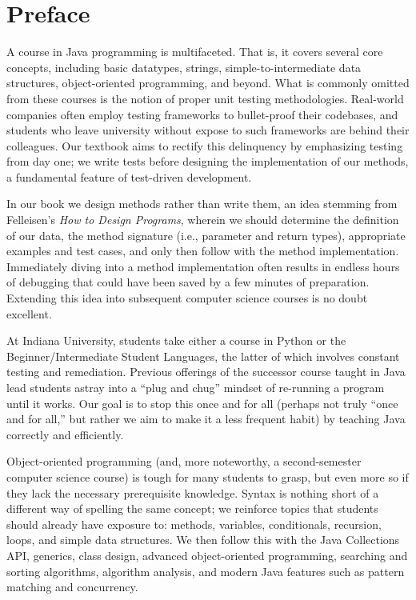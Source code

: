 \chapter*{Preface}

A course in Java programming is multifaceted. That is, it covers several core concepts, including basic datatypes, strings, simple-to-intermediate data structures, object-oriented programming, and beyond. What is commonly omitted from these courses is the notion of proper unit testing methodologies. Real-world companies often employ testing frameworks to bullet-proof their codebases, and students who leave university without expose to such frameworks are behind their colleagues. Our textbook aims to rectify this delinquency by emphasizing testing from day one; we write tests before designing the implementation of our methods, a fundamental feature of test-driven development.

In our book we design methods rather than write them, an idea stemming from Felleisen's \textit{How to Design Programs}, wherein we should determine the definition of our data, the method signature (i.e., parameter and return types), appropriate examples and test cases, and only then follow with the method implementation. Immediately diving into a method implementation often results in endless hours of debugging that could have been saved by a few minutes of preparation. Extending this idea into subsequent computer science courses is no doubt excellent.

At Indiana University, students take either a course in Python or the Beginner/Intermediate Student Languages, the latter of which involves constant testing and remediation. Previous offerings of the successor course taught in Java lead students astray into a ``plug and chug'' mindset of re-running a program until it works. Our goal is to stop this once and for all (perhaps not truly ``once and for all,'' but rather we aim to make it a less frequent habit) by teaching Java correctly and efficiently. 

Object-oriented programming (and, more noteworthy, a second-semester computer science course) is tough for many students to grasp, but even more so if they lack the necessary prerequisite knowledge. Syntax is nothing short of a different way of spelling the same concept; we reinforce topics that students should already have exposure to: methods, variables, conditionals, recursion, loops, and simple data structures. We then follow this with the Java Collections API, generics, class design, advanced object-oriented programming, searching and sorting algorithms, algorithm analysis, and modern Java features such as pattern matching and concurrency. 

